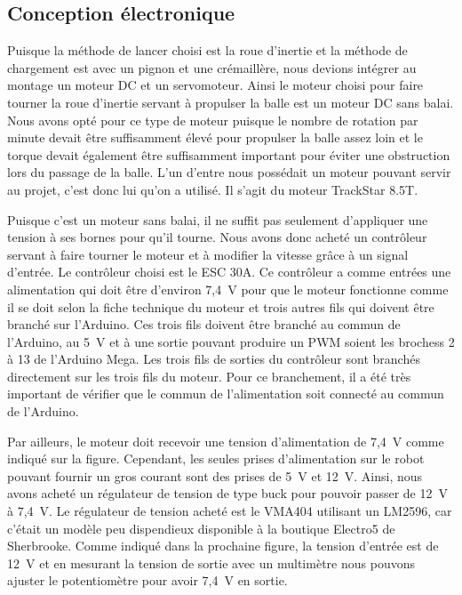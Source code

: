 
\subsection{Conception électronique}

Puisque la méthode de lancer choisi est la roue d’inertie et la méthode de chargement est avec un pignon et une crémaillère, nous devions intégrer au montage un moteur DC et un servomoteur.
Ainsi le moteur choisi pour faire tourner la roue d’inertie servant à propulser la balle est un moteur DC sans balai.
Nous avons opté pour ce type de moteur puisque le nombre de rotation par minute devait être suffisamment élevé pour propulser la balle assez loin et le torque devait également être suffisamment important pour éviter une obstruction lors du passage de la balle.
L’un d’entre nous possédait un moteur pouvant servir au projet, c’est donc lui qu’on a utilisé.
Il s’agit du moteur TrackStar 8.5T.


Puisque c’est un moteur sans balai, il ne suffit pas seulement d’appliquer une tension à ses bornes pour qu’il tourne.
Nous avons donc acheté un contrôleur servant à faire tourner le moteur et à modifier la vitesse grâce à un signal d'entrée.
Le contrôleur choisi est le ESC 30A.
Ce contrôleur a comme entrées une alimentation qui doit être d’environ 7,4~V pour que le moteur fonctionne comme il se doit selon la fiche technique du moteur \cite{noauthor_trackstar_nodate} et trois autres fils qui doivent être branché sur l’Arduino.
Ces trois fils doivent être branché au commun de l’Arduino, au 5~V et à une sortie pouvant produire un PWM soient les brochess 2 à 13 de l’Arduino Mega.
Les trois fils de sorties du contrôleur sont branchés directement sur les trois fils du moteur.
Pour ce branchement, il a été très important de vérifier que le commun de l’alimentation soit connecté au commun de l’Arduino.


Par ailleurs, le moteur doit recevoir une tension d’alimentation de 7,4~V comme indiqué sur la figure.
Cependant, les seules prises d’alimentation sur le robot pouvant fournir un gros courant sont des prises de 5~V et 12~V.
Ainsi, nous avons acheté un régulateur de tension de type buck pour pouvoir passer de 12~V à 7,4~V.
Le régulateur de tension acheté est le VMA404 utilisant un LM2596, car c’était un modèle peu dispendieux disponible à la boutique Electro5 de Sherbrooke.
Comme indiqué dans la prochaine figure, la tension d’entrée est de 12~V et en mesurant la tension de sortie avec un multimètre nous pouvons ajuster le potentiomètre pour avoir 7,4~V en sortie.

